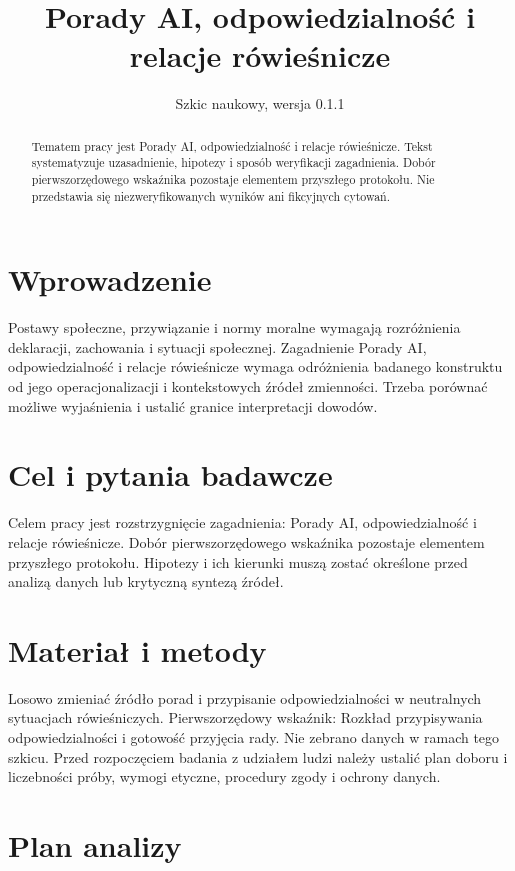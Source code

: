 \documentclass[11pt,a4paper]{article}
\title{Porady AI, odpowiedzialność i relacje rówieśnicze}
\author{}
\date{Szkic naukowy, wersja 0.1.1}
\begin{document}
\maketitle

\begin{abstract}

Tematem pracy jest Porady AI, odpowiedzialność i relacje rówieśnicze. Tekst systematyzuje uzasadnienie, hipotezy i sposób weryfikacji zagadnienia. Dobór pierwszorzędowego wskaźnika pozostaje elementem przyszłego protokołu. Nie przedstawia się niezweryfikowanych wyników ani fikcyjnych cytowań.

\end{abstract}

\section{Wprowadzenie}

Postawy społeczne, przywiązanie i normy moralne wymagają rozróżnienia deklaracji, zachowania i sytuacji społecznej. Zagadnienie Porady AI, odpowiedzialność i relacje rówieśnicze wymaga odróżnienia badanego konstruktu od jego operacjonalizacji i kontekstowych źródeł zmienności. Trzeba porównać możliwe wyjaśnienia i ustalić granice interpretacji dowodów.

\section{Cel i pytania badawcze}

Celem pracy jest rozstrzygnięcie zagadnienia: Porady AI, odpowiedzialność i relacje rówieśnicze. Dobór pierwszorzędowego wskaźnika pozostaje elementem przyszłego protokołu. Hipotezy i ich kierunki muszą zostać określone przed analizą danych lub krytyczną syntezą źródeł.

\section{Materiał i metody}

Losowo zmieniać źródło porad i przypisanie odpowiedzialności w neutralnych sytuacjach rówieśniczych. Pierwszorzędowy wskaźnik: Rozkład przypisywania odpowiedzialności i gotowość przyjęcia rady. Nie zebrano danych w ramach tego szkicu. Przed rozpoczęciem badania z udziałem ludzi należy ustalić plan doboru i liczebności próby, wymogi etyczne, procedury zgody i ochrony danych.

\section{Plan analizy}
\end{document}
